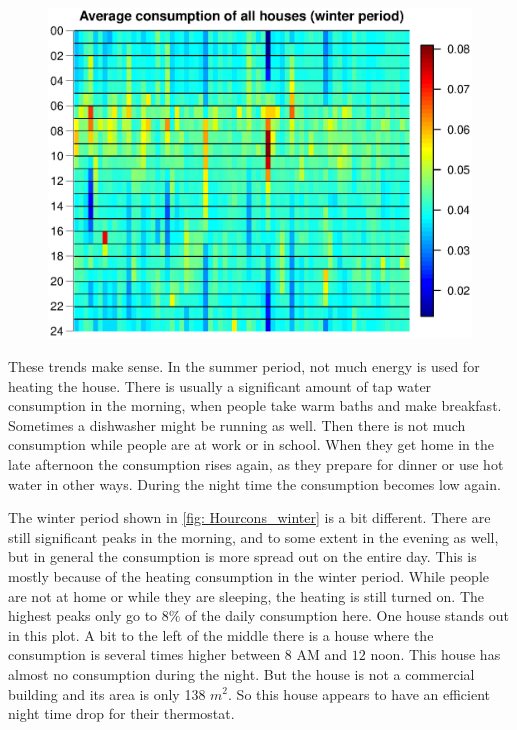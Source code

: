 \begin{figure}
    \centering
    \includegraphics[scale=0.80]{../../../figures/Heatmap_winter.eps}
\end{figure}

\noindent These trends make sense. In the summer period, not much energy is used for heating the house. There is usually a significant amount of tap water consumption in the morning, when people take warm baths and make breakfast. Sometimes a dishwasher might be running as well. Then there is not much consumption while people are at work or in school. When they get home in the late afternoon the consumption rises again, as they prepare for dinner or use hot water in other ways. During the night time the consumption becomes low again.

\noindent The winter period shown in \cref{fig: Hourcons_winter} is a bit different. There are still significant peaks in the morning, and to some extent in the evening as well, but in general the consumption is more spread out on the entire day. This is mostly because of the heating consumption in the winter period. While people are not at home or while they are sleeping, the heating is still turned on. The highest peaks only go to $8\%$ of the daily consumption here. One house stands out in this plot. A bit to the left of the middle there is a house where the consumption is several times higher between $8$ AM and $12$ noon. This house has almost no consumption during the night. But the house is not a commercial building and its area is only 138 $m^2$. So this house appears to have an efficient night time drop for their thermostat.

